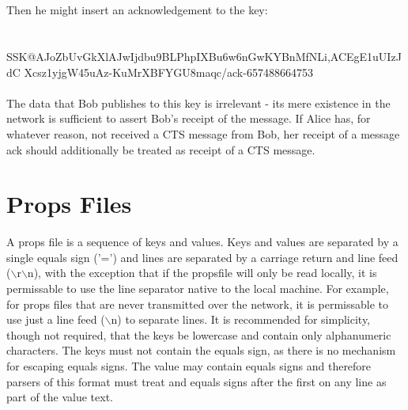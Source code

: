 \documentclass[12pt,a4paper]{article}
\begin{document}
 \\
\\
Then he might insert an acknowledgement to the key: \\
\\
\\
SSK@AJoZbUvGkXlAJwI\-jdbu9BLPhpIXBu6\-w6nGwKYBnMfNLi,ACEgE1uUIzJdC\-
Xcsz1yjgW45u\-Az-KuMrXBFYG\-U8maqc/ack-657488664753 \\
\\
The data that Bob publishes to this key is irrelevant - its mere existence in the network is
sufficient to assert Bob's receipt of the message. If Alice has, for whatever reason, not received a
CTS message from Bob, her receipt of a message ack should additionally be treated as receipt of a
CTS message.

\appendix

\section{Props Files}
\label{PropsFile}
A props file is a sequence of keys and values. Keys and values are separated by a single equals sign
('=') and lines are separated by a carriage return and line feed ($\backslash$r$\backslash$n), with
the exception that if the propsfile will only be read locally, it is permissable to use the line
separator native to the local machine. For example, for props files that are never transmitted over
the network, it is permissable to use just a line feed ($\backslash$n) to separate lines. It is
recommended for simplicity, though not required, that the keys be lowercase and contain only
alphanumeric characters. The keys must not contain the equals sign, as there is no mechanism for
escaping equals signs. The value may contain equals signs and therefore parsers of this format must
treat and equals signs after the first on any line as part of the value text.
\end{document}
